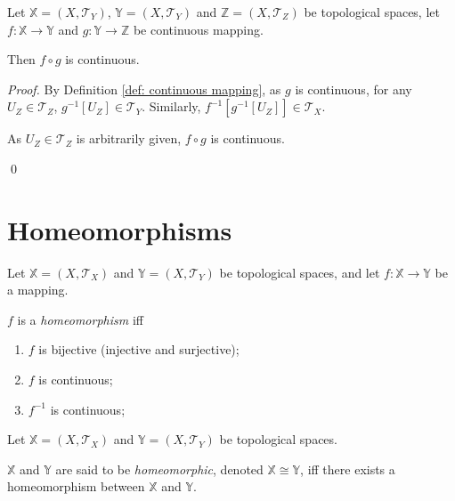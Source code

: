 \begin{proposition}
	\label{prop: composite of continuous mapping is continuous}
	Let $\mathbb X = (X, \mathcal T_Y)$, $\mathbb Y = (X, \mathcal T_Y)$ and $\mathbb Z = (X, \mathcal T_Z)$ be topological spaces, let $f: \mathbb X \to \mathbb Y$ and $g: \mathbb Y \to \mathbb Z$ be continuous mapping.
	
	Then $f \circ g$ is continuous.
	
	\begin{proof}
		By Definition \ref{def: continuous mapping}, as $g$ is continuous, for any $U_Z \in \mathcal T_Z$, $g^{-1}[U_Z] \in \mathcal T_Y$. Similarly, $f^{-1}[g^{-1}[U_Z]] \in \mathcal T_X$.
		
		As $U_Z \in \mathcal T_Z$ is arbitrarily given, $f \circ g$ is continuous.
		
		\qed
	\end{proof}
\end{proposition}


\section{Homeomorphisms}


\begin{definition}
	\label{def: homeomorphism}
	Let $\mathbb X = (X, \mathcal T_X)$ and $\mathbb Y = (X, \mathcal T_Y)$ be topological spaces, and let $f: \mathbb X \to \mathbb Y$ be a mapping.
	
	$f$ is a \textit{homeomorphism} iff
	\begin{enumerate}[\bf H1.]
		\item $f$ is bijective (injective and surjective);
		\item $f$ is continuous;
		\item $f^{-1}$ is continuous;
	\end{enumerate}
\end{definition}


\begin{definition}
	\label{def: homeomorphic}
	Let $\mathbb X = (X, \mathcal T_X)$ and $\mathbb Y = (X, \mathcal T_Y)$ be topological spaces.
	
	$\mathbb X$ and $\mathbb Y$ are said to be \textit{homeomorphic}, denoted $\mathbb X \cong \mathbb Y$, iff there exists a homeomorphism between $\mathbb X$ and $\mathbb Y$.
\end{definition}


